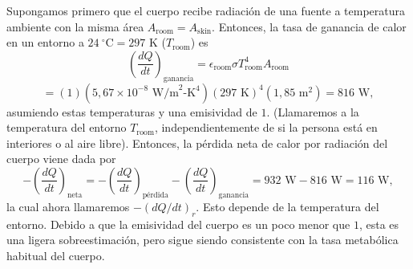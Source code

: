 \documentclass[12pt]{book}
\begin{document}
Supongamos primero que el cuerpo recibe radiación de una fuente a temperatura ambiente con la misma área $A_{\text{room}} = A_{\text{skin}}$. Entonces, la tasa de ganancia de calor en un entorno a $24\ ^\circ\text{C} = 297\text{ K}$ ($T_{\text{room}}$) es
\begin{equation}
\left(\frac{dQ}{dt}\right)_{\text{ganancia}} = \epsilon_{\text{room}} \sigma T_{\text{room}}^4 A_{\text{room}}
\label{eq:642}
\end{equation}
\begin{equation}
= (1)(5{,}67 \times 10^{-8}\text{ W/m}^2\text{-K}^4)(297\text{ K})^4(1{,}85\text{ m}^2) = 816\text{ W},
\label{eq:643}
\end{equation}
asumiendo estas temperaturas y una emisividad de $1$. (Llamaremos a la temperatura del entorno $T_{\text{room}}$, independientemente de si la persona está en interiores o al aire libre). Entonces, la pérdida neta de calor por radiación del cuerpo viene dada por
\begin{equation}
-\left(\frac{dQ}{dt}\right)_{\text{neta}} = -\left(\frac{dQ}{dt}\right)_{\text{pérdida}} - \left(\frac{dQ}{dt}\right)_{\text{ganancia}} = 932\text{ W} - 816\text{ W} = 116\text{ W},
\label{eq:644}
\end{equation}
la cual ahora llamaremos $-\left(dQ/dt\right)_r$. Esto depende de la temperatura del entorno. Debido a que la emisividad del cuerpo es un poco menor que $1$, esta es una ligera sobreestimación, pero sigue siendo consistente con la tasa metabólica habitual del cuerpo.
\end{document}
